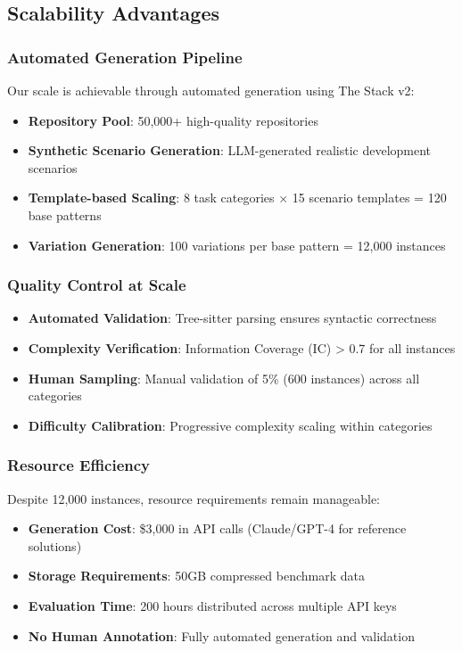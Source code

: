 \documentclass{article}
\begin{document}
\subsection{Scalability Advantages}

\subsubsection{Automated Generation Pipeline}
Our scale is achievable through automated generation using The Stack v2:
\begin{itemize}
    \item \textbf{Repository Pool}: 50,000+ high-quality repositories
    \item \textbf{Synthetic Scenario Generation}: LLM-generated realistic development scenarios
    \item \textbf{Template-based Scaling}: 8 task categories × 15 scenario templates = 120 base patterns
    \item \textbf{Variation Generation}: 100 variations per base pattern = 12,000 instances
\end{itemize}

\subsubsection{Quality Control at Scale}
\begin{itemize}
    \item \textbf{Automated Validation}: Tree-sitter parsing ensures syntactic correctness
    \item \textbf{Complexity Verification}: Information Coverage (IC) > 0.7 for all instances
    \item \textbf{Human Sampling}: Manual validation of 5\% (600 instances) across all categories
    \item \textbf{Difficulty Calibration}: Progressive complexity scaling within categories
\end{itemize}

\subsubsection{Resource Efficiency}
Despite 12,000 instances, resource requirements remain manageable:
\begin{itemize}
    \item \textbf{Generation Cost}: \$3,000 in API calls (Claude/GPT-4 for reference solutions)
    \item \textbf{Storage Requirements}: 50GB compressed benchmark data
    \item \textbf{Evaluation Time}: 200 hours distributed across multiple API keys
    \item \textbf{No Human Annotation}: Fully automated generation and validation
\end{itemize}
\end{document}
